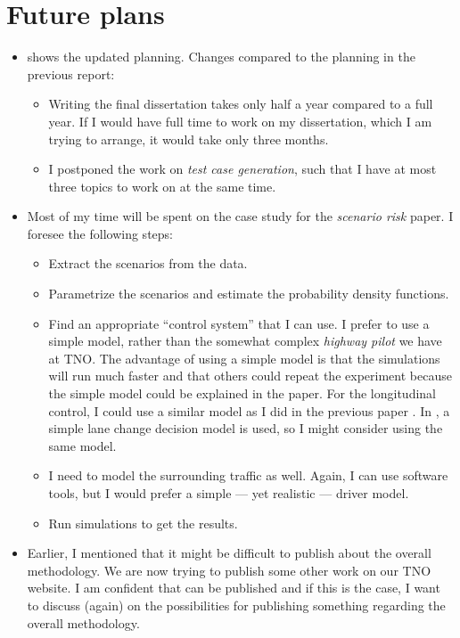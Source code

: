 \documentclass[10pt,final,a4paper,oneside,onecolumn]{article}
\begin{document}
\section{Future plans}

\begin{itemize}
	\item {} shows the updated planning. Changes compared to the planning in the previous report:
	\begin{itemize}
		\item Writing the final dissertation takes only half a year compared to a full year. If I would have full time to work on my dissertation, which I am trying to arrange, it would take only three months. 
		\item I postponed the work on \emph{test case generation}, such that I have at most three topics to work on at the same time.
	\end{itemize}

	\item Most of my time will be spent on the case study for the \emph{scenario risk} paper. I foresee the following steps:
	\begin{itemize}
		\item Extract the scenarios from the data.
		\item Parametrize the scenarios and estimate the probability density functions.
		\item Find an appropriate ``control system'' that I can use. I prefer to use a simple model, rather than the somewhat complex \emph{highway pilot} we have at TNO. The advantage of using a simple model is that the simulations will run much faster and that others could repeat the experiment because the simple model could be explained in the paper. For the longitudinal control, I could use a similar model as I did in the previous paper \cite{degelder2019risk}. In \cite{liu2019novel}, a simple lane change decision model is used, so I might consider using the same model.
		\item I need to model the surrounding traffic as well. Again, I can use software tools, but I would prefer a simple --- yet realistic --- driver model.
		\item Run simulations to get the results.
	\end{itemize}

	\item Earlier, I mentioned that it might be difficult to publish about the overall methodology. We are now trying to publish some other work \cite{degelder2019scenariocategories} on our TNO website. I am confident that \cite{degelder2019scenariocategories} can be published and if this is the case, I want to discuss (again) on the possibilities for publishing something regarding the overall methodology.
\end{itemize}
\end{document}

